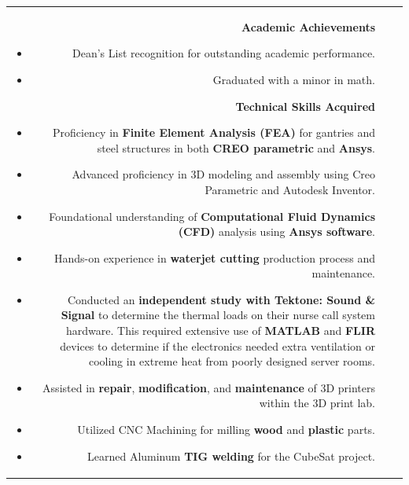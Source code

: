 \documentclass[allblack]{simplehipstercv}
\begin{document}
\begin{paracol}{2}
\begin{tabular}{r| p{} c}
{\begin{itemize}
            \end{itemize}
            \textbf{Academic Achievements}
            \begin{itemize}
                \item Dean's List recognition for outstanding academic performance.
                \item Graduated with a minor in math.
            \end{itemize}
            \textbf{Technical Skills Acquired}
            \begin{itemize}
                \item Proficiency in \textbf{Finite Element Analysis (FEA)} for gantries and steel structures in both \textbf{CREO parametric} and \textbf{Ansys}.
                \item Advanced proficiency in 3D modeling and assembly using Creo Parametric and Autodesk Inventor.
                \item Foundational understanding of \textbf{Computational Fluid Dynamics (CFD)} analysis using \textbf{Ansys software}.
                \item Hands-on experience in \textbf{waterjet cutting} production process and maintenance.
                \item Conducted an \textbf{independent study with Tektone: Sound \& Signal} to determine the thermal loads on their nurse call system hardware. 
                This required extensive use of \textbf{MATLAB} and \textbf{FLIR} devices to determine if the electronics needed extra ventilation or cooling in extreme heat from poorly designed server rooms.
                \item Assisted in \textbf{repair}, \textbf{modification}, and \textbf{maintenance} of 3D printers within the 3D print lab.
                \item Utilized CNC Machining for milling \textbf{wood} and \textbf{plastic} parts.
                \item Learned Aluminum \textbf{TIG welding} for the CubeSat project. 
            \end{itemize}
        } \\
        

\end{tabular}
\end{paracol}
\end{document}
